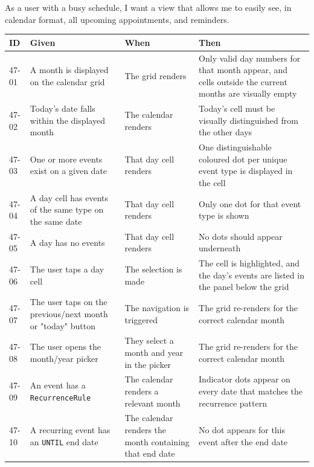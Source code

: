 \documentclass[a4paper,12pt]{article}
\begin{document}
\begin{callout}
As a user with a busy schedule, I want a view that allows me to easily see, in calendar format, all upcoming appointments, and reminders.
\end{callout}

\begin{longtable}{|p{}|p{}|p{}|p{}|}
    \hline
    \textbf{ID} & \textbf{Given} & \textbf{When} & \textbf{Then} \\
    \hline
    \endhead
    47-01 & A month is displayed on the calendar grid & The grid renders & Only valid day numbers for that month appear, and cells outside the current months are visually empty \\
    \hline
    47-02 & Today's date falls within the displayed month & The calendar renders & Today's cell must be visually distinguished from the other days \\
    \hline
    47-03 & One or more events exist on a given date & That day cell renders & One distinguishable coloured dot per unique event type is displayed in the cell \\
    \hline
    47-04 & A day cell has events of the same type on the same date & That day cell renders & Only one dot for that event type is shown \\
    \hline
    47-05 & A day has no events & That day cell renders & No dots should appear underneath \\
    \hline
    47-06 & The user taps a day cell & The selection is made & The cell is highlighted, and the day's events are listed in the panel below the grid \\
    \hline
    47-07 & The user taps on the previous/next month or "today" button & The navigation is triggered & The grid re-renders for the correct calendar month \\
    \hline
    47-08 & The user opens the month/year picker & They select a month and year in the picker & The grid re-renders for the correct calendar month \\
    \hline
    47-09 & An event has a \verb|RecurrenceRule| & The calendar renders a relevant month & Indicator dots appear on every date that matches the recurrence pattern \\
    \hline
    47-10 & A recurring event has an \verb|UNTIL| end date & The calendar renders the month containing that end date & No dot appears for this event after the end date \\
    \hline
\end{longtable}
\end{document}

